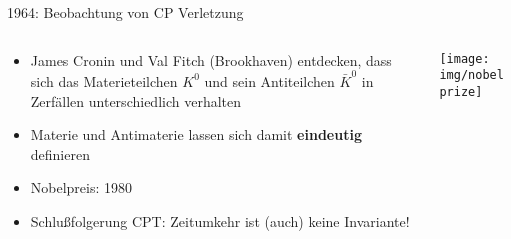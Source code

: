 \begin{frame}{1964: Beobachtung von CP Verletzung}  
    \begin{columns}
        \begin{column}{.7\textwidth}
            \begin{itemize}
                \item James Cronin und Val Fitch (Brookhaven) entdecken, dass sich das Materieteilchen $K^0$ und sein Antiteilchen $\bar K^0$ in Zerfällen unterschiedlich verhalten
                \item Materie und Antimaterie lassen sich damit \textbf{eindeutig} definieren
                \item Nobelpreis: 1980
                \item Schlußfolgerung CPT: Zeitumkehr ist (auch) keine Invariante!
            \end{itemize}
        \end{column}

        \begin{column}{.3\textwidth}
            \centering
            \texttt{[image: img/nobelprize]}
            \scalebox{.4}{(Noble Prize [Public domain])}
        \end{column}
    \end{columns}
\end{frame}

